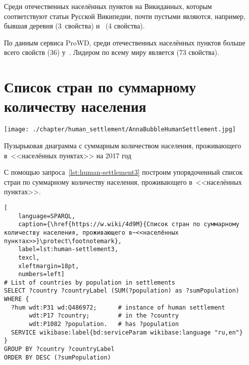 Среди отечественных населённых пунктов на Викиданных, 
которым соответствуют статьи Русской Википедии, 
почти пустыми являются, например, 
бывшая деревня  (3~свойства) 
и~ (4 свойства).

По данным сервиса ProWD, 
среди отечественных населённых пунктов 
больше всего свойств (36) у~. 
Лидером по всему миру является  (73 свойства).



\newpage
\section{Список стран по суммарному количеству населения}

\begin{marginfigure}[0.0cm]
    \texttt{[image: ./chapter/human\_settlement/AnnaBubbleHumanSettlement.jpg]}
    \caption[Сколько населения проживает в~населённых пунктах, 2017.]{Пузырьковая диаграмма с суммарным количеством населения, проживающего в~<<населённых пунктах>> на 2017 год} 
    \label{fig:human-settlement-1}
\end{marginfigure}

С помощью запроса~\ref{lst:human-settlement3} 
построим упорядоченный список стран по суммарному количеству населения, проживающего в~<<населённых пунктах>>.


\lstset{numbers=left, firstnumber=1, frame=single}
\begin{lstlisting}[ 
    language=SPARQL, 
    caption={\href{https://w.wiki/4d9M}{Список стран по суммарному количеству населения, проживающего в~<<населённых пунктах>>}\protect\footnotemark},
    label=lst:human-settlement3,
    texcl,
    xleftmargin=18pt, 
    numbers=left]
# List of countries by population in settlements
SELECT ?country ?countryLabel (SUM(?population) as ?sumPopulation)
WHERE {
  ?hum wdt:P31 wd:Q486972;      # instance of human settlement
       wdt:P17 ?country;        # in the ?country
       wdt:P1082 ?population.   # has ?population
  SERVICE wikibase:label{bd:serviceParam wikibase:language "ru,en"}
}
GROUP BY ?country ?countryLabel 
ORDER BY DESC (?sumPopulation)
\end{lstlisting}%


